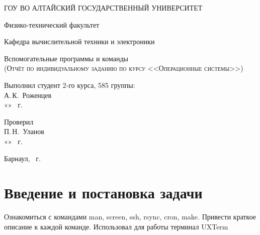\documentclass[a4paper,14pt]{extarticle}
\begin{document}
\begin{titlepage}
  \begin{center}
    ГОУ ВО АЛТАЙСКИЙ ГОСУДАРСТВЕННЫЙ УНИВЕРСИТЕТ
    \vspace{0.25cm}
    
    Физико-технический факультет
    
    Кафедра вычислительной техники и электроники
    \vfill
    
    {\LARGE Вспомогательные программы и команды}\\[5mm]
    \textsc{(Отчёт по индивидуальному заданию по курсу <<Операционные системы>>)}
  \bigskip

\end{center}
\vfill

\newlength{\ML}
\hfill\begin{minipage}{0.4\textwidth}
  Выполнил студент 2-го курса, 585 группы:\\
  \underline{\hspace{\ML}} А.\,К.~Роженцев\\
  «\underline{\hspace{0.7cm}}» \underline{\hspace{2cm}} \the\year~г.
\end{minipage}%
\bigskip

\hfill\begin{minipage}{0.4\textwidth}
  Проверил\\
  \underline{\hspace{\ML}} П.\,Н.~Уланов\\
  «\underline{\hspace{0.7cm}}» \underline{\hspace{2cm}} \the\year~г.
\end{minipage}%
\vfill

\begin{center}
  Барнаул, \the\year~г.
\end{center}
\end{titlepage}


\tableofcontents

\section{Введение и постановка задачи}
Ознакомиться с командами man, screen, ssh, rsync, cron, make. Привести краткое описание к каждой команде. Использовал для работы терминал UXTerm
\end{document}
